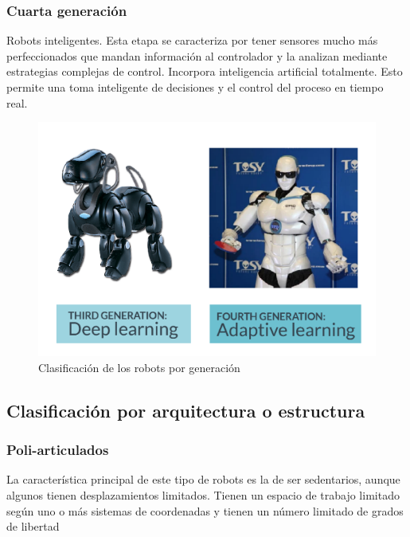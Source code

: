         \subsubsection{Cuarta generación}
            Robots inteligentes. Esta etapa se caracteriza por tener sensores mucho más perfeccionados que mandan información al controlador y la analizan mediante estrategias complejas de control. Incorpora inteligencia artificial totalmente. Esto permite una toma inteligente de decisiones y el control del proceso en tiempo real.
    
    
            \begin{figure}[htb]
            \centering
            \includegraphics[width=1\linewidth]{Main/Chapter2/Images2/Clasificacion-de-los-robots-por-generacion_a.png}
            \caption{Clasificación de los robots por generación}
            \label{f:Cap2_general_5a}
        \end{figure}
        
        \newpage
        
    \subsection{Clasificación por arquitectura o estructura}
        
        \subsubsection{Poli-articulados}
        La característica principal de este tipo de robots es la de ser sedentarios, aunque algunos tienen desplazamientos limitados. Tienen un espacio de trabajo limitado según uno o más sistemas de coordenadas y tienen un número limitado de grados de libertad
        
